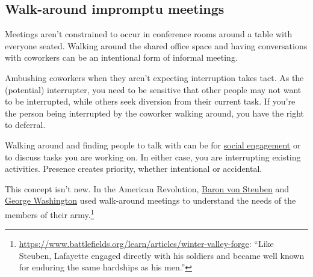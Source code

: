 \subsection*{Walk-around impromptu meetings\label{sec:walk-arounds}}

Meetings aren't constrained to occur in conference rooms around a table with everyone seated. Walking around the shared office space and having conversations with coworkers can be an intentional form of informal meeting. 

Ambushing coworkers when they aren't expecting interruption takes tact. As the (potential) interrupter, you need to be sensitive that other people may not want to be interrupted, while others seek diversion from their current task. If you're the person being interrupted by the coworker walking around, you have the right to deferral. 


Walking around and finding people to talk with can be for 
\hyperref[sec:socializing]{social engagement} 
or to discuss tasks you are working on. 
In either case, you are interrupting existing activities. Presence creates priority,
whether intentional or accidental.





This concept isn't new. 
In the American Revolution, \href{https://en.wikipedia.org/wiki/Friedrich_Wilhelm_von_Steuben}{Baron von Steuben}
\iftoggle{WPinmargin}{\marginpar{$>$Wikipedia: Baron von~Steuben}}{}
and 
\href{https://en.wikipedia.org/wiki/George_Washington}{George Washington}
used walk-around meetings to understand the needs of the members of their army.\footnote{\href{https://www.battlefields.org/learn/articles/winter-valley-forge}{https://www.battlefields.org/learn/articles/winter-valley-forge}: ``Like Steuben, Lafayette engaged directly with his soldiers and became well known for enduring the same hardships as his men.''}

